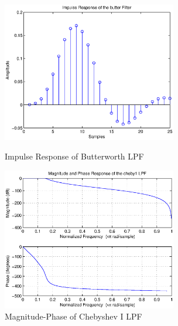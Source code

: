 \documentclass{article}
\begin{document}
\begin{figure}[htb]
\begin{minipage}[b]{0.5\linewidth}
\centering
\includegraphics[width=3in]{project6_03.eps}
\caption{Impulse Response of  Butterworth LPF}
\label{fig:figure3}
\end{minipage}
\hspace{0.5cm}
\begin{minipage}[b]{0.5\linewidth}
\centering
\includegraphics[width=3in]{project6_04.eps}
\caption{Magnitude-Phase of  Chebyshev I LPF }
\label{fig:figure4}
\end{minipage}
\end{figure}
\end{document}

